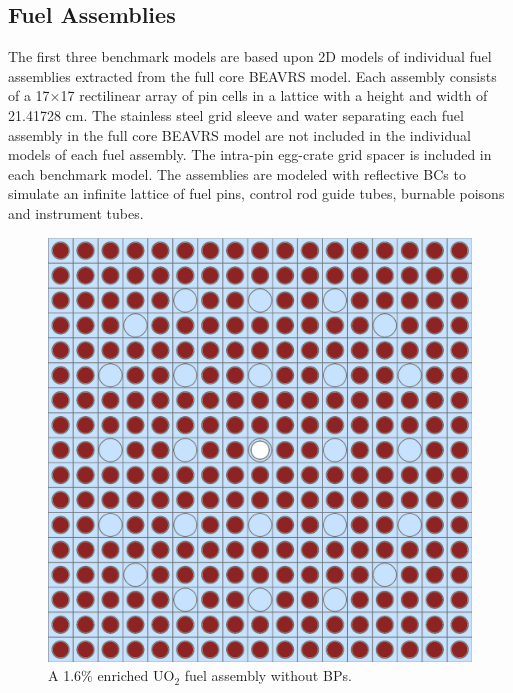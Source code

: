 \subsection{Fuel Assemblies}
\label{subsec:chap7-fuel-assms}

The first three benchmark models are based upon 2D models of individual fuel assemblies extracted from the full core \ac{BEAVRS} model. Each assembly consists of a 17$\times$17 rectilinear array of pin cells in a lattice with a height and width of 21.41728 cm. The stainless steel grid sleeve and water separating each fuel assembly in the full core \ac{BEAVRS} model are not included in the individual models of each fuel assembly. The intra-pin egg-crate grid spacer is included in each benchmark model. The assemblies are modeled with reflective \acp{BC} to simulate an infinite lattice of fuel pins, control rod guide tubes, burnable poisons and instrument tubes. 

\begin{figure}[h!]
  \centering
  \includegraphics[width=0.65\linewidth]{figures/benchmarks/assembly-16}
\vspace{2mm}
\caption[BEAVRS 1.6\% enriched assembly]{A 1.6\% enriched UO$_2$ fuel assembly without \acp{BP}.}
\label{fig:chap7-assm-16}
\end{figure}

